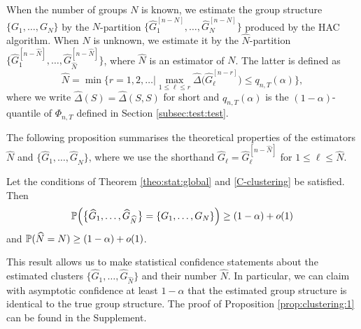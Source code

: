 \documentclass[12pt]{article}
\begin{document}
When the number of groups $N$ is known, we estimate the group structure $\{G_1,\ldots, G_N\}$ by the $N$-partition $\{\widehat{G}_1^{[n-N]},\ldots,\widehat{G}_{N}^{[n-N]}\}$ produced by the HAC algorithm. When $N$ is unknown, we estimate it by the $\widehat{N}$-partition $\{\widehat{G}_1^{[n-\widehat{N}]},\ldots,\widehat{G}_{\widehat{N}}^{[n-\widehat{N}]}\}$, where $\widehat{N}$ is an estimator of $N$. The latter is defined as 
\[ \widehat{N} = \min \Big\{ r = 1,2,\ldots \Big| \max_{1 \le \ell \le r} \widehat{\Delta} \big( \widehat{G}_\ell^{[n-r]} \big) \le q_{n,T}(\alpha) \Big\}, \]
where we write $\widehat{\Delta}(S) = \widehat{\Delta}(S,S)$ for short and $q_{n,T}(\alpha)$ is the $(1-\alpha)$-quantile of $\Phi_{n,T}$ defined in Section \ref{subsec:test:test}. 


The following proposition summarises the theoretical properties of the estimators $\widehat{N}$ and $\{ \widehat{G}_1,\ldots,\widehat{G}_{\widehat{N}} \}$, where we use the shorthand $\widehat{G}_\ell = \widehat{G}_\ell^{[n-\widehat{N}]}$ for $1 \le \ell \le \widehat{N}$. 
\begin{prop}\label{prop:clustering:1}
Let the conditions of Theorem \ref{theo:stat:global} and \ref{C-clustering} be satisfied. Then 
\[ \mathbb{P} \Big( \big\{ \widehat{G}_1,\ldots,\widehat{G}_{\widehat{N}} \big\} = \{ G_1,\ldots, G_N \} \Big) \ge (1-\alpha) + o(1) \]
and $\mathbb{P} ( \widehat{N} = N ) \ge (1-\alpha) + o(1)$. 
\end{prop}
This result allows us to make statistical confidence statements about the estimated clusters $\{ \widehat{G}_1,\ldots,\widehat{G}_{\widehat{N}} \}$ and their number $\widehat{N}$. In particular, we can claim with asymptotic confidence at least $1 - \alpha$ that the estimated group structure is identical to the true group structure. 
The proof of Proposition \ref{prop:clustering:1} can be found in the Supplement.
\end{document}
